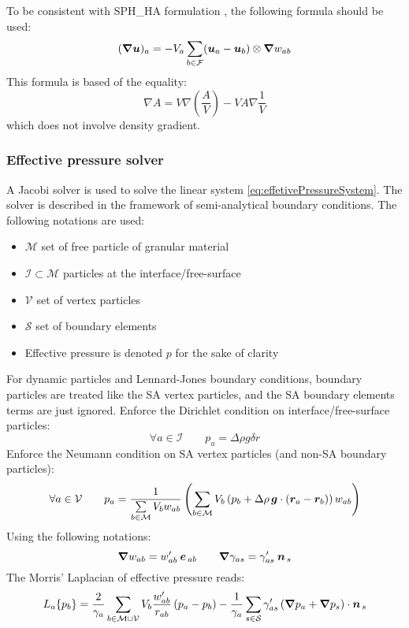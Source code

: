 \documentclass{../GPUSPHtemplate}
\begin{document}
To be consistent with SPH\_HA formulation \citep{hu2006multi}, the following formula should be used:
\begin{equation}
(\bm{\nabla} \bm{u})_a = -V_a \sum\limits_{b\in{\mathcal{F}}} (\bm{u}_a-\bm{u}_b) \otimes \bm{\nabla} w_{ab}
\end{equation}
This formula is based of the equality:
\begin{equation}
\nabla A = V \nabla \left( \dfrac{A}{V} \right) - V A \nabla \dfrac{1}{V}
\end{equation}
which does not involve density gradient.

\subsubsection{Effective pressure solver}
A Jacobi solver is used to solve the linear system \eqref{eq:effetivePressureSystem}. The solver is described in the framework of semi-analytical boundary conditions. The following notations are used:
\begin{itemize}
\item $\mathcal{M}$ set of free particle of granular material
\item $\mathcal{I} \subset \mathcal{M} $ particles at the interface/free-surface
\item $\mathcal{V}$ set of vertex particles
\item $\mathcal{S}$ set of boundary elements
\item Effective pressure is denoted $p$ for the sake of clarity
\end{itemize}
For dynamic particles and Lennard-Jones boundary conditions, boundary particles are treated like the SA vertex particles, and the SA boundary elements terms are just ignored.
%
Enforce the Dirichlet condition on interface/free-surface particles:
\[ \forall a \in \mathcal{I} \qquad p_a =  \Delta \rho g \delta r \]
%
Enforce the Neumann condition on SA vertex particles (and non-SA boundary particles):
\[ \forall a \in \mathcal{V} \qquad
p_a = \dfrac{1}{\sum\limits_{b\in \mathcal{M}} V_b w_{ab}} \left( \sum\limits_{b\in \mathcal{M}} V_b \left(p_b + \Delta\rho \, \bm{g} \cdot \left(\bm{r}_a - \bm{r}_b \right) \right) w_{ab} \right)
\]
%
Using the following notations:
\[ \bm{\nabla} w_{ab} = w_{ab}' \: \bm{e}_{\,ab} \qquad \bm{\nabla} \gamma_{as} = \gamma_{as}' \: \bm{n}_{\,s}\]
%
The Morris' Laplacian of effective pressure reads:
%
\begin{equation*}
L_a\{p_b\} = 
\dfrac{2}{\gamma_a}\sum\limits_{b\in \mathcal{M} \cup \mathcal{V}} V_b \dfrac{w_{ab}'}{r_{ab}} \left(p_a - p_b\right)
- \dfrac{1}{\gamma_a}\sum\limits_{s\in \mathcal{S}} \gamma_{as}' \left( \bm{\nabla} p_a + \bm{\nabla} p_s \right) \cdot \bm{n}_{\,s}
\end{equation*}
\end{document}
